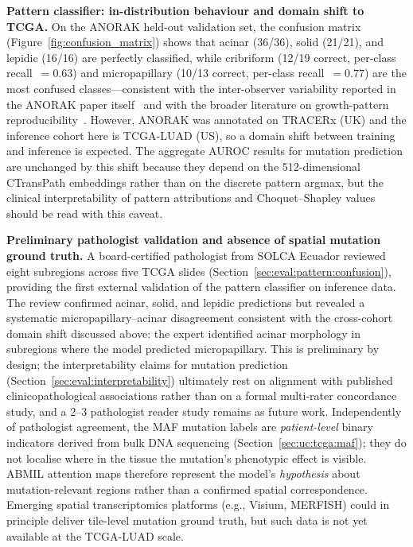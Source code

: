 \textbf{Pattern classifier: in-distribution behaviour and domain
shift to TCGA.}
On the ANORAK held-out validation set, the confusion matrix
(Figure~\ref{fig:confusion_matrix}) shows that acinar (36/36),
solid (21/21), and lepidic (16/16) are perfectly classified, while
cribriform (12/19 correct, per-class recall~$=0.63$) and
micropapillary (10/13 correct, per-class recall~$=0.77$) are the
most confused classes---consistent with the inter-observer
variability reported in the ANORAK paper itself~\cite{anorak2024}
and with the broader literature on growth-pattern
reproducibility~\cite{thunnissen2012reproducibility}.
However, ANORAK was annotated on TRACERx (UK) and the inference
cohort here is TCGA-LUAD (US), so a domain shift between training
and inference is expected.
The aggregate AUROC results for mutation prediction are unchanged
by this shift because they depend on the 512-dimensional
CTransPath embeddings rather than on the discrete pattern argmax,
but the clinical interpretability of pattern attributions and
Choquet--Shapley values should be read with this caveat.

\textbf{Preliminary pathologist validation and absence of spatial
mutation ground truth.}
A board-certified pathologist from SOLCA Ecuador reviewed eight
subregions across five TCGA slides
(Section~\ref{sec:eval:pattern:confusion}), providing the first
external validation of the pattern classifier on inference data.
The review confirmed acinar, solid, and lepidic predictions but
revealed a systematic micropapillary--acinar disagreement
consistent with the cross-cohort domain shift discussed above:
the expert identified acinar morphology in subregions where the
model predicted micropapillary.
This is preliminary by design; the interpretability claims for
mutation prediction (Section~\ref{sec:eval:interpretability})
ultimately rest on alignment with published clinicopathological
associations rather than on a formal multi-rater concordance study,
and a 2--3 pathologist reader study remains as future work.
Independently of pathologist agreement, the MAF mutation labels
are \emph{patient-level} binary indicators derived from bulk DNA
sequencing (Section~\ref{sec:uc:tcga:maf}); they do not localise
where in the tissue the mutation's phenotypic effect is visible.
ABMIL attention maps therefore represent the model's
\emph{hypothesis} about mutation-relevant regions rather than a
confirmed spatial correspondence.
Emerging spatial transcriptomics platforms (e.g., Visium, MERFISH)
could in principle deliver tile-level mutation ground truth, but
such data is not yet available at the TCGA-LUAD scale.


